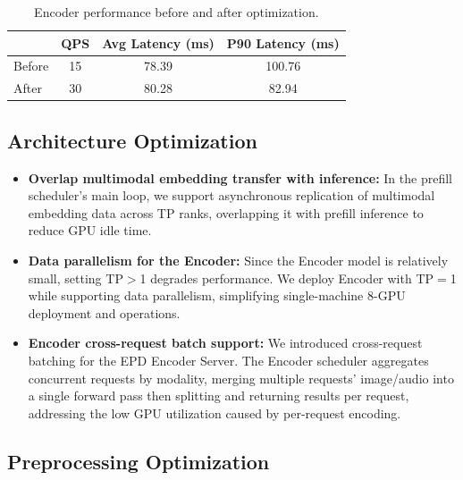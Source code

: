 \begin{table}[t]
\centering
\caption{Encoder performance before and after optimization.}
\label{tab:multimodal_perf}
\begin{tabular}{lccc}
\toprule
 & QPS & Avg Latency (ms) & P90 Latency (ms) \\
\midrule
Before & 15 & 78.39 & 100.76 \\
After  & 30 & 80.28 & 82.94 \\
\bottomrule
\end{tabular}
\end{table}

\subsection{Architecture Optimization}

\begin{itemize}
    \item \textbf{Overlap multimodal embedding transfer with inference:} In the prefill scheduler's main loop, we support asynchronous replication of multimodal embedding data across TP ranks, overlapping it with prefill inference to reduce GPU idle time.
    \item \textbf{Data parallelism for the Encoder:} Since the Encoder model is relatively small, setting TP$>$1 degrades performance. We deploy Encoder with TP$=$1 while supporting data parallelism, simplifying single-machine 8-GPU deployment and operations.
    \item \textbf{Encoder cross-request batch support:} We introduced cross-request batching for the EPD Encoder Server. The Encoder scheduler aggregates concurrent requests by modality, merging multiple requests' image/audio into a single forward pass then splitting and returning results per request, addressing the low GPU utilization caused by per-request encoding.
\end{itemize}

\subsection{Preprocessing Optimization}

